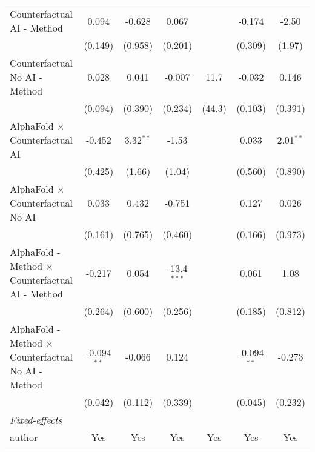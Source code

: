 \begin{tabular}{lcccccc}
   Counterfactual AI - Method                                 & 0.094         & -0.628      & 0.067         &               & -0.174        & -2.50\\   
                                                              & (0.149)       & (0.958)     & (0.201)       &               & (0.309)       & (1.97)\\   
   Counterfactual No AI - Method                              & 0.028         & 0.041       & -0.007        & 11.7          & -0.032        & 0.146\\   
                                                              & (0.094)       & (0.390)     & (0.234)       & (44.3)        & (0.103)       & (0.391)\\   
   AlphaFold $\times$ Counterfactual AI                       & -0.452        & 3.32$^{**}$ & -1.53         &               & 0.033         & 2.01$^{**}$\\   
                                                              & (0.425)       & (1.66)      & (1.04)        &               & (0.560)       & (0.890)\\   
   AlphaFold $\times$ Counterfactual No AI                    & 0.033         & 0.432       & -0.751        &               & 0.127         & 0.026\\   
                                                              & (0.161)       & (0.765)     & (0.460)       &               & (0.166)       & (0.973)\\   
   AlphaFold - Method $\times$ Counterfactual AI - Method     & -0.217        & 0.054       & -13.4$^{***}$ &               & 0.061         & 1.08\\   
                                                              & (0.264)       & (0.600)     & (0.256)       &               & (0.185)       & (0.812)\\   
   AlphaFold - Method $\times$ Counterfactual No AI - Method  & -0.094$^{**}$ & -0.066      & 0.124         &               & -0.094$^{**}$ & -0.273\\   
                                                              & (0.042)       & (0.112)     & (0.339)       &               & (0.045)       & (0.232)\\   
   \midrule
   \emph{Fixed-effects}\\
   author                                                     & Yes           & Yes         & Yes           & Yes           & Yes           & Yes\\  

\end{tabular}

